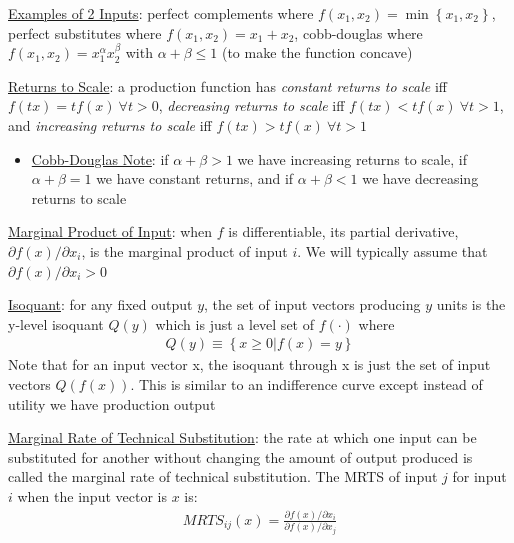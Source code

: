 \documentclass{article}
\begin{document}
  \par
  \underline{Examples of 2 Inputs}: perfect complements where $f(x_{1}, x_{2}) = \min \left\{ x_{1}, x_{2} \right\}$, perfect substitutes where $f(x_{1}, x_{2}) = x_{1} + x_{2}$, cobb-douglas where $f(x_{1}, x_{2}) = x_{1}^{\alpha}x_{2}^{\beta}$ with $\alpha + \beta \leq 1$ (to make the function concave)
  \par
  \underline{Returns to Scale}: a production function has \textit{constant returns to scale} iff $f(tx) = tf(x) \ \forall t > 0$, \textit{decreasing returns to scale} iff $f(tx) < tf(x) \ \forall t > 1$, and \textit{increasing returns to scale} iff $f(tx) > tf(x) \ \forall t > 1$
  \begin{itemize}
    \item  \underline{Cobb-Douglas Note}: if $\alpha + \beta > 1$ we have increasing returns to scale, if $\alpha + \beta = 1$ we have constant returns, and if $\alpha + \beta < 1$ we have decreasing returns to scale
  \end{itemize}
  \par
  \underline{Marginal Product of Input}: when $f$ is differentiable, its partial derivative, $\partial f(x) / \partial x_{i}$, is the marginal product of input $i$. We will typically assume that $\partial f(x) / \partial x_{i} > 0$
  \par
  \underline{Isoquant}: for any fixed output $y$, the set of input vectors producing $y$ units is the y-level isoquant $Q(y)$ which is just a level set of $f(\cdot)$ where
  \begin{gather*}
    Q(y) \equiv \left\{ x \geq 0 | f(x) = y \right\}
  \end{gather*}
  Note that for an input vector x, the isoquant through x is just the set of input vectors $Q(f(x))$. This is similar to an indifference curve except instead of utility we have production output
  \par
  \underline{Marginal Rate of Technical Substitution}: the rate at which one input can be substituted for another without changing the amount of output produced is called the marginal rate of technical substitution. The MRTS of input $j$ for input $i$ when the input vector is $x$ is:
  \begin{gather*}
    MRTS_{ij}(x) = \frac{\partial f(x) / \partial x_{i}}{\partial f(x) / \partial x_{j}}
  \end{gather*}
\end{document}
